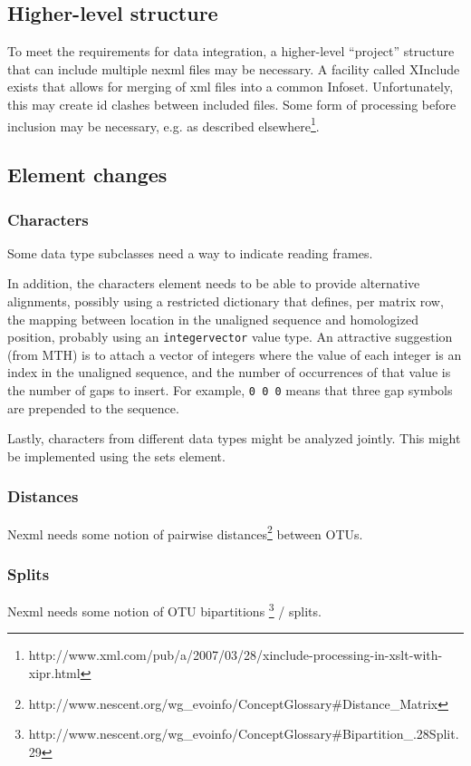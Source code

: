 \documentclass{article}
\newcommand{\code}{\texttt}
\begin{document}
\subsection{Higher-level structure}
To meet the requirements for data integration, a higher-level ``project'' structure that can include multiple nexml files may be 
necessary. A facility called XInclude exists that allows for merging of xml files into a common Infoset. Unfortunately, this may 
create id clashes between included files. Some form of processing before inclusion may be necessary, e.g. as described 
elsewhere\footnote{http://www.xml.com/pub/a/2007/03/28/xinclude-processing-in-xslt-with-xipr.html}.

\subsection{Element changes}

\subsubsection{Characters}
Some data type subclasses need a way to indicate reading frames.

In addition, the characters element needs to be able to provide alternative alignments, possibly using 
a restricted dictionary that defines, per matrix row, the mapping between location in the unaligned sequence and 
homologized position, probably using an \code{integervector} value type. An attractive suggestion (from MTH) is to attach a 
vector of integers where the value of each integer is an index in the unaligned sequence, and the number of occurrences of that value 
is the number of gaps to insert. For example, \code{0 0 0} means that three gap symbols are prepended to the sequence.

Lastly, characters from different data types might be analyzed jointly. This might be implemented using the sets element.

\subsubsection{Distances}
Nexml needs some notion of pairwise distances\footnote{http://www.nescent.org/wg\_evoinfo/ConceptGlossary\#Distance\_Matrix} between OTUs.

\subsubsection{Splits}
Nexml needs some notion of OTU bipartitions \footnote{http://www.nescent.org/wg\_evoinfo/ConceptGlossary\#Bipartition\_.28Split.29} / splits.
\end{document}
